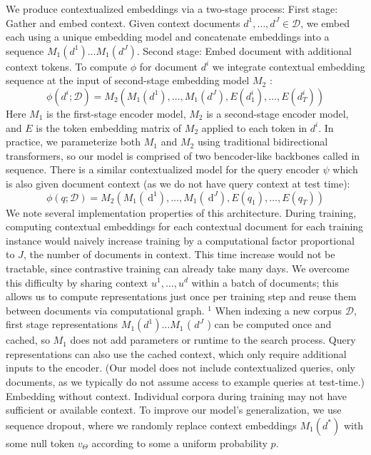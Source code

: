 \begin{tabular}
{We produce contextualized embeddings via a two-stage process:
First stage: Gather and embed context. Given context documents \(d^{1}, \ldots, d^{J} \in \mathcal{D}\), we embed each using a unique embedding model and concatenate embeddings into a sequence \(M_{1}\left(d^{1}\right) \ldots M_{1}\left(d^{J}\right)\).
Second stage: Embed document with additional context tokens. To compute \(\phi\) for document \(d^{i}\) we integrate contextual embedding sequence at the input of second-stage embedding model \(M_{2}\) :
\[
\phi\left(d^{i} ; \mathcal{D}\right)=M_{2}\left(M_{1}\left(d^{1}\right), \ldots, M_{1}\left(d^{J}\right), E\left(d_{1}^{i}\right), \ldots, E\left(d_{T}^{i}\right)\right)
\]
Here \(M_{1}\) is the first-stage encoder model, \(M_{2}\) is a second-stage encoder model, and \(E\) is the token embedding matrix of \(M_{2}\) applied to each token in \(d^{i}\). In practice, we parameterize both \(M_{1}\) and \(M_{2}\) using traditional bidirectional transformers, so our model is comprised of two bencoder-like backbones called in sequence.
There is a similar contextualized model for the query encoder \(\psi\) which is also given document context (as we do not have query context at test time):
\[
\phi\left(q ; \mathcal{D}\right)=M_{2}\left(M_{1}\left(\mathrm{~d}^{1}\right), \ldots, M_{1}\left(\mathrm{~d}^{J}\right), E\left(q_{1}\right), \ldots, E\left(q_{T}\right)\right)
\]
We note several implementation properties of this architecture. During training, computing contextual embeddings for each contextual document for each training instance would naively increase training by a computational factor proportional to \(J\), the number of documents in context. This time increase would not be tractable, since contrastive training can already take many days. We overcome this difficulty by sharing context \(u^{1}, \ldots, u^{d}\) within a batch of documents; this allows us to compute representations just once per training step and reuse them between documents via computational graph. \({ }^{1}\)
When indexing a new corpus \(\mathcal{D}\), first stage representations \(M_{1}\left(d^{1}\right) \ldots M_{1}\) ( \(d^{J}\) ) can be computed once and cached, so \(M_{1}\) does not add parameters or runtime to the search process. Query representations can also use the cached context, which only require additional inputs to the encoder. (Our model does not include contextualized queries, only documents, as we typically do not assume access to example queries at test-time.)
Embedding without context. Individual corpora during training may not have sufficient or available context. To improve our model's generalization, we use sequence dropout, where we randomly replace context embeddings \(M_{1}\left(d^{*}\right)\) with some null token \(v_{\Theta}\) according to some a uniform probability \(p\).
}
\end{tabular}

